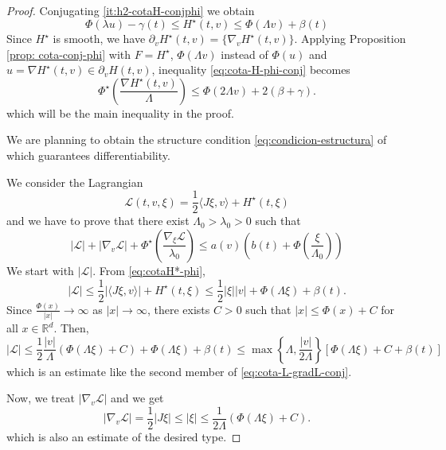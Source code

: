 \documentclass[twoside]{article}
\theoremstyle{remark}
\newcommand{\rr}{\mathbb{R}}
\renewcommand{\leq}{\leqslant}
\begin{document}
\begin{proof}
Conjugating \ref{it:h2-cotaH-conjphi} we obtain
\begin{equation}\label{eq:cotaH*-phi}
\Phi(\lambda u)-\gamma(t)\leq H^{\star}(t,v)\leq \Phi(\Lambda v)+\beta(t)
\end{equation}
Since $H^{\star}$ is smooth, we have $\partial_vH^{\star}(t,v)=\{\nabla_v H^{\star}(t,v)\}$.
Applying Proposition \ref{prop: cota-conj-phi} with $F=H^{\star}$, $\Phi(\Lambda v)$ instead of $\Phi(u)$
and $u=\nabla H^{\star}(t,v) \in \partial_v H(t,v)$, inequality \eqref{eq:cota-H-phi-conj} becomes
\begin{equation}\label{eq:main-phiconj-phi}
\Phi^{\star}\left(\frac{\nabla H^{\star}(t,v)}{\Lambda}\right)\leq \Phi(2\Lambda v)+2(\beta+\gamma).
\end{equation}
which will be the main inequality in the proof.

We are planning to obtain  the structure condition \eqref{eq:condicion-estructura} of \cite{MA2017} which guarantees
differentiability. 

We consider the Lagrangian 
\begin{equation}
\mathcal{L}(t,v,\xi)=\frac{1}{2}\langle J\xi,v\rangle + H^{\star}(t,\xi)
\end{equation}
and we have to prove that there exist $\Lambda_0>\lambda_0>0$
such that 
\begin{equation}\label{eq:cota-L-gradL-conj}
|\mathcal{L}|+|\nabla_v\mathcal{L}|+\Phi^{\star}\left(\frac{\nabla_{\xi}\mathcal{L}}{\lambda_0}\right)\leq
a(v)\left(b(t)+\Phi\left(\frac{\xi}{\Lambda_0}\right)\right)
\end{equation}
We start with $|\mathcal{L}|$. From \eqref{eq:cotaH*-phi}, 
\[
|\mathcal{L}|\leq \frac{1}{2} |\langle J\xi,v\rangle|+H^{\star}(t,\xi)\leq \frac{1}{2}|\xi||v|+\Phi(\Lambda \xi)+\beta(t). 
\]
Since $\frac{\Phi(x)}{|x|}\to \infty$ as $|x|\to \infty$, there exists $C>0$ such that $|x|\leq \Phi(x)+C$ for all $x \in \rr^d$.
Then, 
\[
|\mathcal{L}|\leq \frac{1}{2} \frac{|v|}{\Lambda}\left(\Phi( \Lambda \xi)+C\right)+\Phi(\Lambda \xi)+\beta(t)
\leq \max\left\{\Lambda, \frac{|v|}{2\Lambda}\right\}
\left[\Phi(\Lambda \xi)+C+\beta(t)\right]
\] 
which is an estimate like  the second member of \eqref{eq:cota-L-gradL-conj}.

Now, we treat $|\nabla_v \mathcal{L}|$ and we get
\begin{equation}\label{eq:cota-grad-v}
|\nabla_v \mathcal{L}|=\frac{1}{2}|J\xi|\leq |\xi| \leq \frac{1}{2 \Lambda}(\Phi(\Lambda \xi)+C).
\end{equation}
which is also an estimate of the desired type.


\end{proof}
\end{document}
